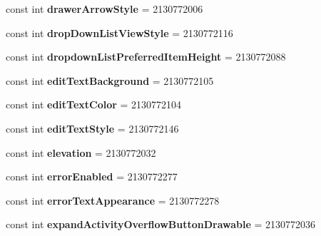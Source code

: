 \begin{DoxyCompactItemize}
const int {\bfseries drawer\+Arrow\+Style} = 2130772006
\item 
\mbox{\label{classXaria_1_1Resource_1_1Attribute_a528eddad5e8d411971d71a5224fceadf}} 
const int {\bfseries drop\+Down\+List\+View\+Style} = 2130772116
\item 
\mbox{\label{classXaria_1_1Resource_1_1Attribute_ad417adb8f9ad82ab3b5b689f8a4aa1aa}} 
const int {\bfseries dropdown\+List\+Preferred\+Item\+Height} = 2130772088
\item 
\mbox{\label{classXaria_1_1Resource_1_1Attribute_abcbf462bf22d6788b499ceca346fe486}} 
const int {\bfseries edit\+Text\+Background} = 2130772105
\item 
\mbox{\label{classXaria_1_1Resource_1_1Attribute_a1a00a5d6bd3fc418e41389acec80f1c4}} 
const int {\bfseries edit\+Text\+Color} = 2130772104
\item 
\mbox{\label{classXaria_1_1Resource_1_1Attribute_a7e3b4a5c44b5ff35f8e0c0061840f3ce}} 
const int {\bfseries edit\+Text\+Style} = 2130772146
\item 
\mbox{\label{classXaria_1_1Resource_1_1Attribute_aab04422956020306b908a9695d63b46a}} 
const int {\bfseries elevation} = 2130772032
\item 
\mbox{\label{classXaria_1_1Resource_1_1Attribute_acc1b513dc4fe39b640b79fbf1bd2e987}} 
const int {\bfseries error\+Enabled} = 2130772277
\item 
\mbox{\label{classXaria_1_1Resource_1_1Attribute_ac3e361a9ca25a671e5ff68ab4d5ca404}} 
const int {\bfseries error\+Text\+Appearance} = 2130772278
\item 
\mbox{\label{classXaria_1_1Resource_1_1Attribute_a16a4314e52a38479dc1cb4e5a219880c}} 
const int {\bfseries expand\+Activity\+Overflow\+Button\+Drawable} = 2130772036
\item 
\mbox{\label{classXaria_1_1Resource_1_1Attribute_a479b5323e63270a4601f2bcb4f25dbb9}} 

\end{DoxyCompactItemize}
